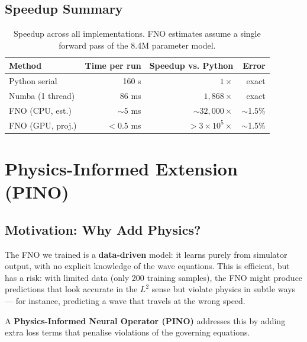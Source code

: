 \documentclass[12pt, a4paper]{article}
\theoremstyle{definition}
\begin{document}
\subsection{Speedup Summary}

\begin{table}[H]
  \centering
  \caption{Speedup across all implementations.  FNO estimates assume a single
           forward pass of the 8.4M parameter model.}
  \label{tab:speedup}
  \begin{tabular}{lrrr}
    \toprule
    \textbf{Method} & \textbf{Time per run} & \textbf{Speedup vs. Python}
    & \textbf{Error} \\
    \midrule
    Python serial   & 160 s      & $1\times$                & exact \\
    Numba (1 thread)& 86 ms      & $1{,}868\times$          & exact \\
    FNO (CPU, est.) & $\sim$5 ms & $\sim$$32{,}000\times$   & $\sim$1.5\% \\
    FNO (GPU, proj.)& $<$0.5 ms  & $>$$3\times10^5\times$   & $\sim$1.5\% \\
    \bottomrule
  \end{tabular}
\end{table}

\section{Physics-Informed Extension (PINO)}
\label{sec:pino}

\subsection{Motivation: Why Add Physics?}

The FNO we trained is a \textbf{data-driven} model: it learns purely from
simulator output, with no explicit knowledge of the wave equations.  This is
efficient, but has a risk: with limited data (only 200 training samples), the
FNO might produce predictions that look accurate in the $L^2$ sense but
violate physics in subtle ways — for instance, predicting a wave that travels
at the wrong speed.

A \textbf{Physics-Informed Neural Operator (PINO)} addresses this by adding
extra loss terms that penalise violations of the governing equations.
\end{document}
